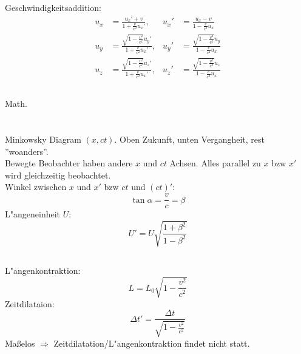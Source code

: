 \documentclass[12pt]{report}
\begin{document}
Geschwindigkeitsaddition:
\begin{align*}
u_x&=\frac{u_x'+v}{1+\frac{v}{c^2}u_x'},&u_x'&=\frac{u_x-v}{1-\frac{v}{c^2}u_x}\\
u_y&=\frac{\sqrt{1-\frac{v^2}{c^2}}u_y'}{1+\frac{v}{c^2}u_x'},&u_y'&=\frac{\sqrt{1-\frac{v^2}{c^2}}u_y}{1-\frac{v}{c^2}u_x}\\
u_z&=\frac{\sqrt{1-\frac{v^2}{c^2}}u_z'}{1+\frac{v}{c^2}u_x'},&u_z'&=\frac{\sqrt{1-\frac{v^2}{c^2}}u_z}{1-\frac{v}{c^2}u_x}
\end{align*}

\subsection{}

Math.

\section{}

\subsection{}

\subsection{}

Minkowsky Diagram $(x,ct)$. Oben Zukunft, unten Vergangheit, rest ''woanders''.\\
Bewegte Beobachter haben andere $x$ und $ct$ Achsen. Alles parallel zu $x$ bzw $x'$ wird gleichzeitig beobachtet.\\
Winkel zwischen $x$ und $x'$ bzw $ct$ und $(ct)'$: \[\tan\alpha=\frac{v}{c}=\beta\]
L"angeneinheit $U$: \[U'=U\sqrt{\frac{1+\beta^2}{1-\beta^2}}\]

\subsection{}

L"angenkontraktion:
\[L=L_0\sqrt{1-\frac{v^2}{c^2}}\]
Zeitdilataion:
\[\Delta t'=\frac{\Delta t}{\sqrt{1-\frac{v^2}{c^2}}}\]
Ma\ss elos $\Rightarrow$ Zeitdilatation/L"angenkontraktion findet nicht statt.

\section{}
\end{document}
